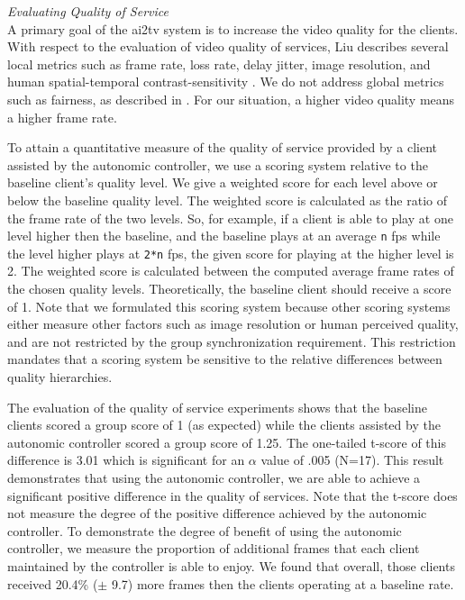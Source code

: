 \documentclass{sig-alternate}
\begin{document}
\textit{Evaluating Quality of Service} \\
A primary goal of the ai2tv system is to increase the video quality
for the clients.  With respect to the evaluation of video quality of
services, Liu describes several local metrics such as frame rate, loss
rate, delay jitter, image resolution, and human spatial-temporal
contrast-sensitivity \cite{LIU}.  We do not address global metrics
such as fairness, as described in \cite{LIU}.  For our situation, a
higher video quality means a higher frame rate.

To attain a quantitative measure of the quality of service provided by
a client assisted by the autonomic controller, we use a scoring system
relative to the baseline client's quality level.  We give a weighted
score for each level above or below the baseline quality level.  The
weighted score is calculated as the ratio of the frame rate of the two
levels.  So, for example, if a client is able to play at one level
higher then the baseline, and the baseline plays at an average
\texttt{n} fps while the level higher plays at \texttt{2*n} fps, the
given score for playing at the higher level is 2.  The weighted score
is calculated between the computed average frame rates of the chosen
quality levels.  Theoretically, the baseline client should receive a
score of 1.  Note that we formulated this scoring system because other
scoring systems \cite{scoring systems} either measure other factors
such as image resolution or human perceived quality, and are not
restricted by the group synchronization requirement.  This restriction
mandates that a scoring system be sensitive to the relative
differences between quality hierarchies.

The evaluation of the quality of service experiments shows that the
baseline clients scored a group score of 1 (as expected) while the
clients assisted by the autonomic controller scored a group score of
1.25.  The one-tailed t-score of this difference is 3.01 which is
significant for an $\alpha$ value of .005 (N=17).  This result
demonstrates that using the autonomic controller, we are able to
achieve a significant positive difference in the quality of services.
Note that the t-score does not measure the degree of the positive
difference achieved by the autonomic controller.  To demonstrate the
degree of benefit of using the autonomic controller, we measure the
proportion of additional frames that each client maintained by the
controller is able to enjoy.  We found that overall, those clients
received 20.4\% ($\pm$ 9.7) more frames then the clients operating at
a baseline rate.
\end{document}
